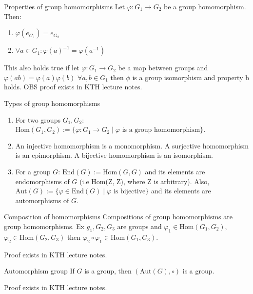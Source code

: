 \documentclass[a4paper]{article}
\begin{document}
\begin{ther}{Properties of group homomorphisms}
Let $\varphi : G_1 \to G_2$ be a group homomorphism. Then:
\begin{enumerate}[label=(\alph*)]
    \item $\varphi(e_{G_1}) = e_{G_2}$
    \item $\forall a \in G_1 : \varphi(a)^{-1} = \varphi(a^{-1})$
\end{enumerate}
\end{ther}
\begin{add}
    This also holds true if let $\varphi : G_1\to G_2$ be a map between groups and $\varphi(ab)=\varphi(a)\varphi(b)$ $\forall a, b \in G_1$ then $\phi$ is a group isomorphism and property b holds. OBS proof exists in KTH lecture notes. 
\end{add}

\begin{defi}{Types of group homomorphisms}
\begin{enumerate}[label=(\alph*)]
    \item For two groups $G_1, G_2$: $\text{Hom}(G_1,G_2) := \{\varphi : G_1 \to G_2 \mid \varphi \text{ is a group homomorphism}\}$.
    \item An injective homomorphism is a monomorphism. A surjective homomorphism is an epimorphism. A bijective homomorphism is an isomorphism.
    \item For a group $G$: $\text{End}(G) := \text{Hom}(G,G)$ and its elements are endomorphisms of $G$ (i.e Hom(Z, Z), where Z is arbitrary). Also, $\text{Aut}(G) := \{\varphi \in \text{End}(G) \mid \varphi \text{ is bijective}\}$ and its elements are automorphisms of $G$.
\end{enumerate}
\end{defi}

\begin{ther}{Composition of homomorphisms}
Compositions of group homomorphisms are group homomorphisms. Ex $g_1, G_2, G_3$ are groups and $\varphi_1 \in \text{Hom}(G_1, G_2)$, $\varphi_2 \in \text{Hom}(G_2, G_3)$ then $\varphi_2 \circ \varphi_1 \in \text{Hom}(G_1, G_3)$.
\end{ther}
\begin{add}
    Proof exists in KTH lecture notes.
\end{add}

\begin{ther}{Automorphism group}
If $G$ is a group, then $(\text{Aut}(G), \circ)$ is a group.
\end{ther}
\begin{add}
    Proof exists in KTH lecture notes.
\end{add}
\end{document}
